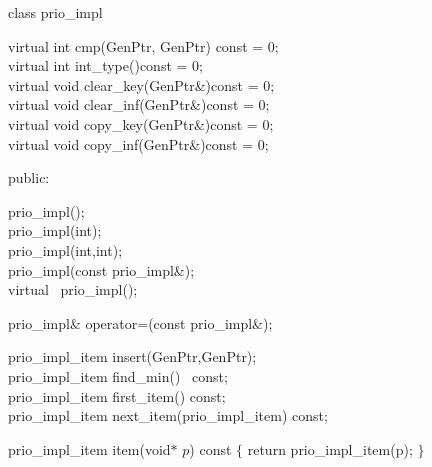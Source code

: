 class prio\_impl { 

\hspace*{.5cm}virtual int  cmp(GenPtr, GenPtr) const = 0;\\
\hspace*{.5cm}virtual int  int\_type()\hspace*{2.3cm}const = 0;\\
\hspace*{.5cm}virtual void clear\_key(GenPtr\&)\hspace*{.35cm}const = 0;\\
\hspace*{.5cm}virtual void clear\_inf(GenPtr\&)\hspace*{.45cm}const = 0;\\
\hspace*{.5cm}virtual void copy\_key(GenPtr\&)\hspace*{.35cm}const = 0;\\
\hspace*{.5cm}virtual void copy\_inf(GenPtr\&)\hspace*{.5cm}const = 0;

public:

\hspace*{.5cm}prio\_impl();\\
\hspace*{.5cm}prio\_impl(int);\\
\hspace*{.5cm}prio\_impl(int,int);\\
\hspace*{.5cm}prio\_impl(const prio\_impl\&);\\
\hspace*{.5cm}virtual ~prio\_impl();

\hspace*{.5cm}prio\_impl\& operator=(const prio\_impl\&);

\hspace*{.5cm}prio\_impl\_item insert(GenPtr,GenPtr);\\
\hspace*{.5cm}prio\_impl\_item find\_min() \ const;\\
\hspace*{.5cm}prio\_impl\_item first\_item() const;\\
\hspace*{.5cm}prio\_impl\_item next\_item(prio\_impl\_item) const;

\hspace*{.5cm}prio\_impl\_item item(void$*$ $p$) const $\{$ return prio\_impl\_item(p); $\}$
 
}
